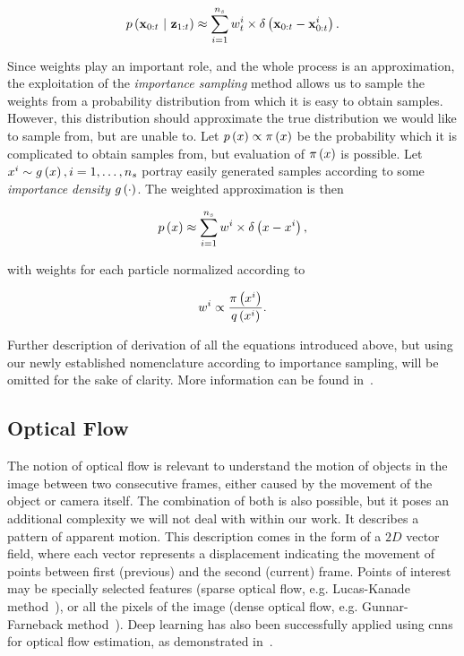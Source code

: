 \begin{equation}
    p \left( \mathbf{x}_{0:t} \ | \ \mathbf{z}_{1:t} \right) \approx \sum_{i = 1}^{n_s} {w}_{t}^{i} \times {\delta} \left( \mathbf{x}_{0:t} - {\mathbf{x}}_{0:t}^{i} \right).
\end{equation}

Since weights play an important role, and the whole process is an approximation, the exploitation of the \emph{importance sampling} method allows us to sample the weights from a probability distribution from which it is easy to obtain samples. However, this distribution should approximate the true distribution we would like to sample from, but are unable to. Let $p \left( x \right) \propto {\pi} \left( x \right)$ be the probability which it is complicated to obtain samples from, but evaluation of ${\pi} \left( x \right)$ is possible. Let $x^i \sim {g} \left( x \right), i = 1, \dots, n_s$ portray easily generated samples according to some \emph{importance density} ${g} \left( \cdot \right)$. The weighted approximation is then

\begin{equation}
    p \left( x \right) \approx \sum_{i = 1}^{n_s} w^i \times {\delta} \left( x - x^i \right),
\end{equation}

\noindent with weights for each particle normalized according to

\begin{equation}
    w^i \propto \frac{{\pi} \left( x^i \right)}{{q} \left( x^i \right)}.
\end{equation}

Further description of derivation of all the equations introduced above, but using our newly established nomenclature according to importance sampling, will be omitted for the sake of clarity. More information can be found in~\cite{Arulampalam2007}.

\subsection{Optical Flow}
\label{ssec:OpticalFlow}

The notion of optical flow is relevant to understand the motion of objects in the image between two consecutive frames, either caused by the movement of the object or camera itself. The combination of both is also possible, but it poses an additional complexity we will not deal with within our work. It describes a pattern of apparent motion. This description comes in the form of a $2D$ vector field, where each vector represents a displacement indicating the movement of points between first (previous) and the second (current) frame. Points of interest may be specially selected features (sparse optical flow, e.g. Lucas-Kanade method~\cite{Lucas1981}), or all the pixels of the image (dense optical flow, e.g. Gunnar-Farneback method~\cite{GunnarFarneback}). Deep learning has also been successfully applied using \glspl{cnn} for optical flow estimation, as demonstrated in~\cite{Dosovitskiy2015}.

